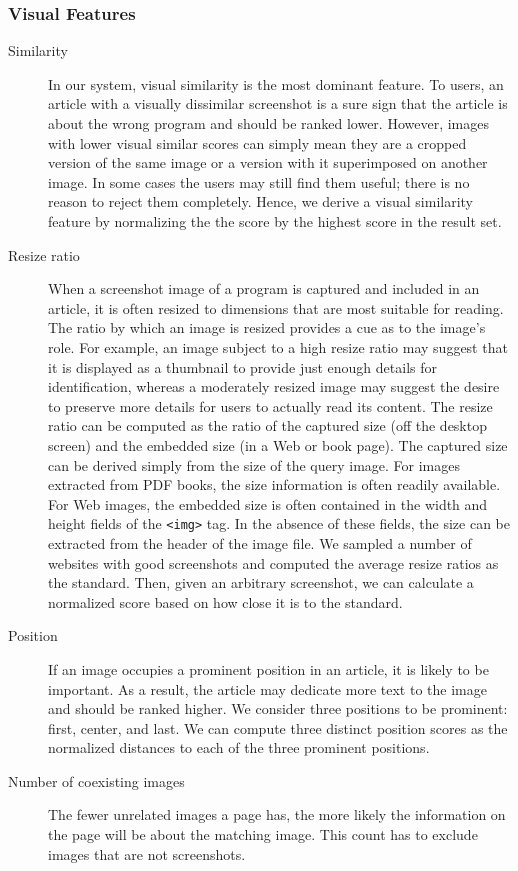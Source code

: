 \documentclass{www2010-submission}
\begin{document}
\subsubsection{Visual Features}

\begin{description}

\item[Similarity] In our system, visual similarity is the most
  dominant feature. To users, an article with a visually dissimilar
  screenshot is a sure sign that the article is about the wrong
  program and should be ranked lower. However, images with lower
  visual similar scores can simply mean they are a cropped version of
  the same image or a version with it superimposed on another
  image. In some cases the users may still find them useful; there is
  no reason to reject them completely. Hence, we derive a visual
  similarity feature by normalizing the the score by the highest score
  in the result set.

\item[Resize ratio] When a screenshot image of a program is captured
  and included in an article, it is often resized to dimensions that
  are most suitable for reading. The ratio by which an image is
  resized provides a cue as to the image's role. For example, an image
  subject to a high resize ratio may suggest that it is displayed as a
  thumbnail to provide just enough details for identification, whereas
  a moderately resized image may suggest the desire to preserve more
  details for users to actually read its content. The resize ratio
  can be computed as the ratio of the captured size (off the desktop
  screen) and the embedded size (in a Web or book page). The captured
  size can be derived simply from the size of the query image. For
  images extracted from PDF books, the size information is often
  readily available. For Web images, the embedded size is often
  contained in the width and height fields of the \texttt{<img>} tag. In the
  absence of these fields, the size can be extracted from the header
  of the image file. We sampled a number of websites with good
  screenshots and computed the average resize ratios as the standard.
  Then, given an arbitrary screenshot, we can calculate a normalized
  score based on how close it is to the standard.

\item[Position] If an image occupies a prominent position in an
  article, it is likely to be important. As a result, the article may
  dedicate more text to the image and should be ranked higher.  We
  consider three positions to be prominent: first, center, and
  last. We can compute three distinct position scores as the
  normalized distances to each of the three prominent positions.

\item[Number of coexisting images] The fewer unrelated images a page has,
  the more likely the information on the page will be about the
  matching image. This count has to exclude images that are not screenshots.

\end{description}
\end{document}
